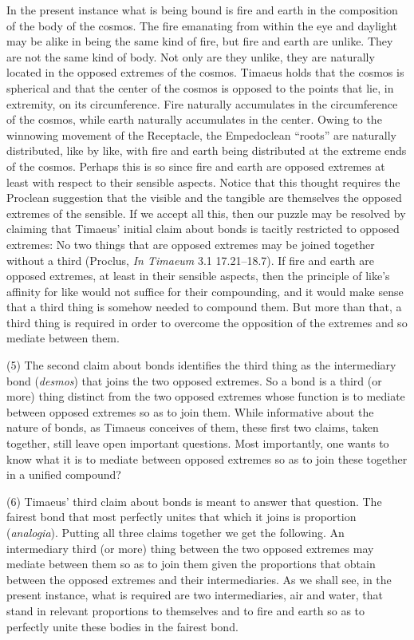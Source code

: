 In the present instance what is being bound is fire and earth in the composition of the body of the cosmos. The fire emanating from within the eye and daylight may be alike in being the same kind of fire, but fire and earth are unlike. They are not the same kind of body. Not only are they unlike, they are naturally located in the opposed extremes of the cosmos. Timaeus holds that the cosmos is spherical and that the center of the cosmos is opposed to the points that lie, in extremity, on its circumference. Fire naturally accumulates in the circumference of the cosmos, while earth naturally accumulates in the center. Owing to the winnowing movement of the Receptacle, the Empedoclean ``roots'' are naturally distributed, like by like, with fire and earth being distributed at the extreme ends of the cosmos. Perhaps this is so since fire and earth are opposed extremes at least with respect to their sensible aspects. Notice that this thought requires the Proclean suggestion that the visible and the tangible are themselves the opposed extremes of the sensible. If we accept all this, then our puzzle may be resolved by claiming that Timaeus' initial claim about bonds is tacitly restricted to opposed extremes: No two things that are opposed extremes may be joined together without a third (Proclus, \emph{In Timaeum} 3.1 17.21--18.7). If fire and earth are opposed extremes, at least in their sensible aspects, then the principle of like's affinity for like would not suffice for their compounding, and it would make sense that a third thing is somehow needed to compound them. But more than that, a third thing is required in order to overcome the opposition of the extremes and so mediate between them.

(5) The second claim about bonds identifies the third thing as the intermediary bond (\emph{desmos}) that joins the two opposed extremes. So a bond is a third (or more) thing distinct from the two opposed extremes whose function is to mediate between opposed extremes so as to join them. While informative about the nature of bonds, as Timaeus conceives of them, these first two claims, taken together, still leave open important questions. Most importantly, one wants to know what it is to mediate between opposed extremes so as to join these together in a unified compound? 

(6) Timaeus' third claim about bonds is meant to answer that question. The fairest bond that most perfectly unites that which it joins is proportion (\emph{analogia}). Putting all three claims together we get the following. An intermediary third (or more) thing between the two opposed extremes may mediate between them so as to join them given the proportions that obtain between the opposed extremes and their intermediaries. As we shall see, in the present instance, what is required are two intermediaries, air and water, that stand in relevant proportions to themselves and to fire and earth so as to perfectly unite these bodies in the fairest bond.

